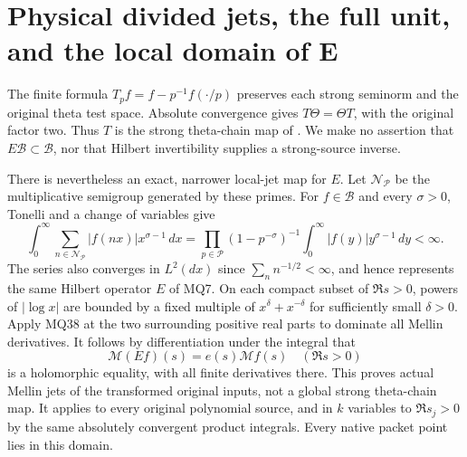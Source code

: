 \documentclass[11pt]{article}
\newcommand{\M}{\mathcal M}
\newcommand{\B}{\mathscr B}
\begin{document}
\section{Physical divided jets, the full unit, and the local domain of E}
The finite formula $T_pf=f-p^{-1}f(\cdot/p)$ preserves each
strong seminorm and the original theta test space. Absolute
convergence gives $T\Theta=\Theta T$, with the original factor
two. Thus $T$ is the strong theta-chain map of \cite{SD}.
We make no assertion that $E\B\subset\B$, nor that Hilbert
invertibility supplies a strong-source inverse.

There is nevertheless an exact, narrower local-jet map for $E$.
Let $\mathcal N_{\mathcal P}$ be the multiplicative semigroup
generated by these primes. For $f\in\B$ and every $\sigma>0$,
Tonelli and a change of variables give
\[
 \int_0^\infty\sum_{n\in\mathcal N_{\mathcal P}}
 |f(nx)|x^{\sigma-1}\,dx
 =\prod_{p\in\mathcal P}(1-p^{-\sigma})^{-1}
       \int_0^\infty|f(y)|y^{\sigma-1}\,dy<\infty.           \tag{MQ38}
\]
The series also converges in $L^2(dx)$ since
$\sum_n n^{-1/2}<\infty$, and hence represents the same Hilbert
operator $E$ of MQ7. On each compact subset of $\Re s>0$, powers
of $|\log x|$ are bounded by a fixed multiple of
$x^\delta+x^{-\delta}$ for sufficiently small $\delta>0$.
Apply MQ38 at the two surrounding positive real parts to dominate
all Mellin derivatives. It follows by differentiation under the
integral that
\[
 \M(Ef)(s)=e(s)\M f(s)\quad(\Re s>0)                      \tag{MQ39}
\]
is a holomorphic equality, with all finite derivatives there. This
proves actual Mellin jets of the transformed original inputs,
not a global strong theta-chain map. It applies to every original
polynomial source, and in $k$ variables to $\Re s_j>0$ by the
same absolutely convergent product integrals. Every native packet
point lies in this domain.
\end{document}
